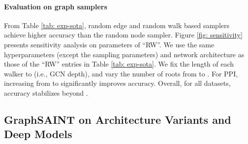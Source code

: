 \documentclass{article} \usepackage{iclr2020_conference,times}
\newcommand{\graphsaint}{{\fontfamily{lmtt}\selectfont GraphSAINT}}
\begin{document}
\paragraph{Evaluation on graph samplers} From Table \ref{tab: exp-sota}, random edge and random walk based samplers achieve higher accuracy than the random node sampler. Figure \ref{fig: sensitivity} presents sensitivity analysis on parameters of ``RW''. We use the same hyperparameters (except the sampling parameters) and network architecture as those of the ``RW'' entries in  Table \ref{tab: exp-sota}. We fix the length of each walker to  (i.e., GCN depth), and vary the number of roots  from  to . For PPI, increasing  from  to  significantly improves accuracy. Overall, for all datasets, accuracy stabilizes beyond . 










\subsection{{\graphsaint} on Architecture Variants and Deep Models\label{sec: exp extension}}
\end{document}
